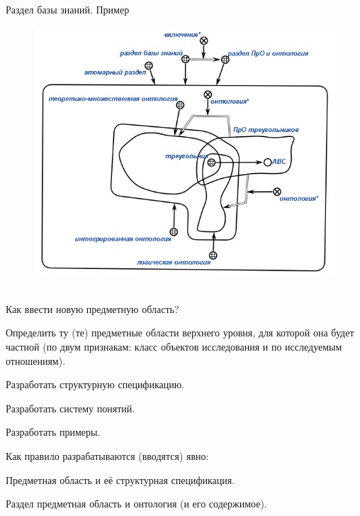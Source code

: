 \begin{frame}{\\Раздел базы знаний. Пример}
	\topline
	\justifying
	\vspace{8mm}
	
	\begin{figure}
		\centering
		\includegraphics[scale=0.53]{figures/kb_develop_principles/example.png}
	\end{figure}
	
\end{frame}

\begin{frame}{\\Как ввести новую предметную область?}
	\topline
	\justifying
	\vspace{8mm}
	
\begin{textitemize}
	\item Определить ту (те) предметные области верхнего уровня, для которой она будет частной (по двум признакам: класс объектов исследования и по исследуемым отношениям).
	\item Разработать структурную спецификацию. 
	\item Разработать систему понятий. 
	\item Разработать примеры.
\end{textitemize}
\bigskip
Как правило разрабатываются (вводятся) явно:
\begin{textitemize}
	\item Предметная область и её структурная спецификация.
	\item Раздел предметная область и онтология (и его содержимое). 
\end{textitemize}

\end{frame}


